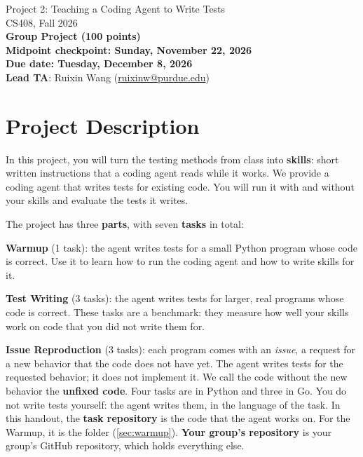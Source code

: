 \documentclass[letterpaper,11pt]{article}
\begin{document}
\begin{center}
    {\LARGE{Project 2: Teaching a Coding Agent to Write Tests}}\\
    \vspace*{10pt}
    {\Large{CS408, Fall 2026}}\\
    \vspace*{10pt}
    {\large{\textbf{Group Project (100 points)\\
        Midpoint checkpoint: Sunday, November 22, 2026\\
        Due date: Tuesday, December 8, 2026}}}\\
    \vspace*{15pt}
    \textbf{Lead TA}: Ruixin Wang (\href{mailto:ruixinw@purdue.edu}{ruixinw@purdue.edu})
\end{center}

\section{Project Description}
\label{sec:description}

In this project, you will turn the testing methods from class into
\textbf{skills}: short written instructions that a coding agent reads while it
works. We provide a coding agent that writes tests for existing code. You will
run it with and without your skills and evaluate the tests it writes.

The project has three \textbf{parts}, with seven \textbf{tasks} in total:
\squishenumerate
 \item \textbf{Warmup} (1 task): the agent writes tests for a small Python
   program whose code is correct. Use it to learn how to run the coding agent
   and how to write skills for it.
 \item \textbf{Test Writing} (3 tasks): the agent writes tests for larger, real
   programs whose code is correct. These tasks are a benchmark: they measure
   how well your skills work on code that you did not write them for.
 \item \textbf{Issue Reproduction} (3 tasks): each program comes with an
   \emph{issue}, a request for a new behavior that the code does not have yet.
   The agent writes tests for the requested behavior; it does not implement it.
   We call the code without the new behavior the \textbf{unfixed code}.
\squishenumerateend
Four tasks are in Python and three in Go. You do not write tests yourself: the
agent writes them, in the language of the task. In this handout, the
\textbf{task repository} is the code that the agent works on. For the Warmup,
it is the folder  (\autoref{sec:warmup}).
\textbf{Your group's repository} is your group's GitHub repository, which
holds everything else.
\end{document}
